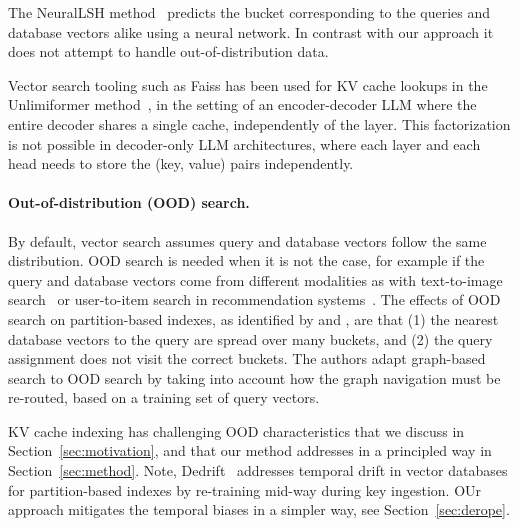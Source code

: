The NeuralLSH method~\cite{dong2019learning} predicts the bucket corresponding to the queries and database vectors alike using a neural network. 
%
In contrast with our approach it does not attempt to handle out-of-distribution data. 

Vector search tooling such as Faiss has been used for KV cache lookups in the Unlimiformer method~\citep{bertsch2024unlimiformer}, in the setting of an encoder-decoder LLM where the entire decoder shares a single cache, independently of the layer. 
This factorization is not possible in decoder-only LLM architectures, where each layer and each head needs to store the (key, value) pairs independently.
%



%

%


%


\paragraph{Out-of-distribution (OOD) search.}

By default, vector search assumes query and database vectors follow the same distribution. 
OOD search is needed when it is not the case, for example if the query and database vectors come from different modalities as with text-to-image search~\citep{simhadri2024results} or user-to-item search in recommendation systems~\citep{paterek2007improving}.
%
The effects of OOD search on partition-based indexes, as identified by \citet{jaiswal2022ood} and \citet{chen2024roargraph}, are that 
(1) the nearest database vectors to the query are spread over many buckets, and 
(2) the query assignment does not visit the correct buckets.
The authors adapt graph-based search to OOD search by taking into account how the graph navigation must be re-routed, based on a training set of query vectors. 

%

%
%
%

KV cache indexing has challenging OOD characteristics that we discuss in Section~\ref{sec:motivation}, and that our method \OURS addresses in a principled way in  Section~\ref{sec:method}. 
%
Note, Dedrift~\citep{baranchuk2023dedrift} addresses temporal drift in vector databases for partition-based indexes by re-training mid-way during key ingestion. 
OUr \OURS approach mitigates the temporal biases in a simpler way, see  Section~\ref{sec:derope}.
%

%
%

%
%



%
%



